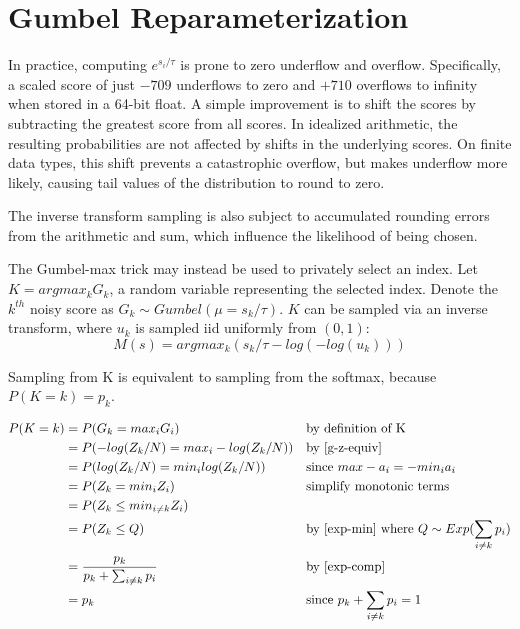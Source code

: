 \documentclass{article}
\begin{document}
\section{Gumbel Reparameterization}
\label{gumbel-reparam}

In practice, computing $e^{s_i / \tau}$ is prone to zero underflow and overflow.
Specifically, a scaled score of just $-709$ underflows to zero and $+710$ overflows to infinity when stored in a 64-bit float.
A simple improvement is to shift the scores by subtracting the greatest score from all scores.
In idealized arithmetic, the resulting probabilities are not affected by shifts in the underlying scores.
On finite data types, this shift prevents a catastrophic overflow, but makes underflow more likely,
causing tail values of the distribution to round to zero.

The inverse transform sampling is also subject to accumulated rounding errors from the arithmetic and sum,
which influence the likelihood of being chosen.

The Gumbel-max trick may instead be used to privately select an index.
Let $K = argmax_k G_k$, a random variable representing the selected index.
Denote the $k^{th}$ noisy score as $G_k \sim Gumbel(\mu = s_k / \tau)$.
$K$ can be sampled via an inverse transform, where $u_k$ is sampled iid uniformly from $(0, 1)$:
\begin{equation}
    M(s) = argmax_k (s_k / \tau - log(-log(u_k)))
\end{equation}

\begin{theorem}
    \label{gumbel-equiv}
Sampling from K is equivalent to sampling from the softmax, because $P(K=k) = p_k$. \cite{Medina2020DuffAD}
\end{theorem}
\begin{align*}
    P(K = k) &= P(G_k = max_i G_i) &&\text{by definition of K} \\
    &= P(-log(Z_k / N) = max_i -log(Z_k / N)) &&\text{by \ref{g-z-equiv}}\\
    &= P(log(Z_k / N) = min_i log(Z_k / N)) &&\text{since } max -a_i = -min_i a_i \\
    &= P(Z_k = min_i Z_i) &&\text{simplify monotonic terms} \\
    &= P(Z_k \leq min_{i \neq k} Z_i) \\
    &= P(Z_k \leq Q) &&\text{by \ref{exp-min} where } Q \sim Exp(\sum_{i \neq k} p_i)\\
    &= \frac{p_k}{p_k + \sum_{i \neq k} p_i}  &&\text{by \ref{exp-comp}} \\
    &= p_k &&\text{since } p_k + \sum_{i \neq k} p_i = 1
\end{align*}
\end{document}

